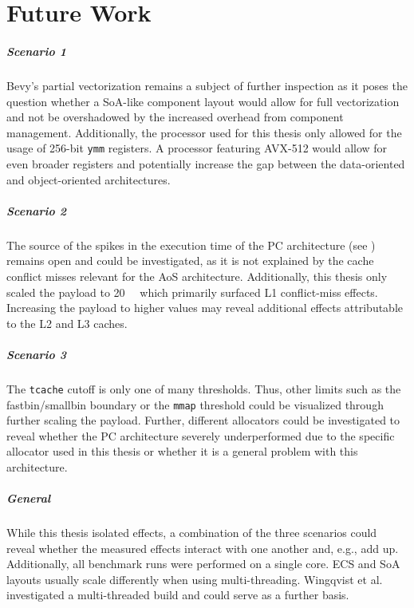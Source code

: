  
\cleardoubleoddpage
\chapter{Future Work}
\label{sec:future-work}
\paragraph{Scenario 1} Bevy's partial vectorization remains a subject of further inspection as it poses the question whether a \ac{SoA}-like component layout \cite{bevy_contiguous} would allow for full vectorization and not be overshadowed by the increased overhead from component management. Additionally, the processor used for this thesis only allowed for the usage of \num{256}-bit \texttt{ymm} registers. A processor featuring AVX-512 would allow for even broader registers and potentially increase the gap between the data-oriented and object-oriented architectures.

\paragraph{Scenario 2} 
The source of the spikes in the execution time of the \ac{PC} architecture (see ) remains open and could be investigated, as it is not explained by the cache conflict misses relevant for the \ac{AoS} architecture. Additionally, this thesis only scaled the payload to \qty{20}{\kibi\byte} which primarily surfaced L1 conflict-miss effects. Increasing the payload to higher values may reveal additional effects attributable to the L2 and L3 caches. 

\paragraph{Scenario 3} 
The \texttt{tcache} cutoff is only one of many thresholds. Thus, other limits such as the fastbin/smallbin boundary or the \texttt{mmap} threshold could be visualized through further scaling the payload. Further, different allocators could be investigated to reveal whether the \ac{PC} architecture severely underperformed due to the specific allocator used in this thesis or whether it is a general problem with this architecture. 

\paragraph{General}
While this thesis isolated effects, a combination of the three scenarios could reveal whether the measured effects interact with one another and, e.g., add up. Additionally, all benchmark runs were performed on a single core. \ac{ECS} and \ac{SoA} layouts usually scale differently when using multi-threading. Wingqvist et al. \cite{wingqvist2022evaluating} investigated a multi-threaded build and could serve as a further basis. 

